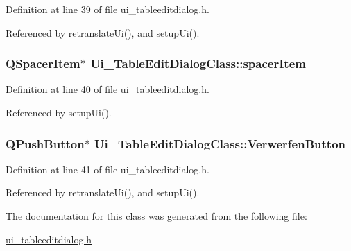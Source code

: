 Definition at line 39 of file ui\_\-tableeditdialog.h.

Referenced by retranslateUi(), and setupUi().\hypertarget{class_ui___table_edit_dialog_class_524dc1c83939859e38ac60e68c7672b0}{
\subsubsection[spacerItem]{\setlength{\rightskip}{0pt plus 5cm}QSpacerItem$\ast$ {\bf Ui\_\-TableEditDialogClass::spacerItem}}}
\label{class_ui___table_edit_dialog_class_524dc1c83939859e38ac60e68c7672b0}




Definition at line 40 of file ui\_\-tableeditdialog.h.

Referenced by setupUi().\hypertarget{class_ui___table_edit_dialog_class_c52944369c75cb418ac1c307acb6f04c}{
\subsubsection[VerwerfenButton]{\setlength{\rightskip}{0pt plus 5cm}QPushButton$\ast$ {\bf Ui\_\-TableEditDialogClass::VerwerfenButton}}}
\label{class_ui___table_edit_dialog_class_c52944369c75cb418ac1c307acb6f04c}




Definition at line 41 of file ui\_\-tableeditdialog.h.

Referenced by retranslateUi(), and setupUi().

The documentation for this class was generated from the following file:\begin{CompactItemize}
\item 
\hyperlink{ui__tableeditdialog_8h}{ui\_\-tableeditdialog.h}\end{CompactItemize}
